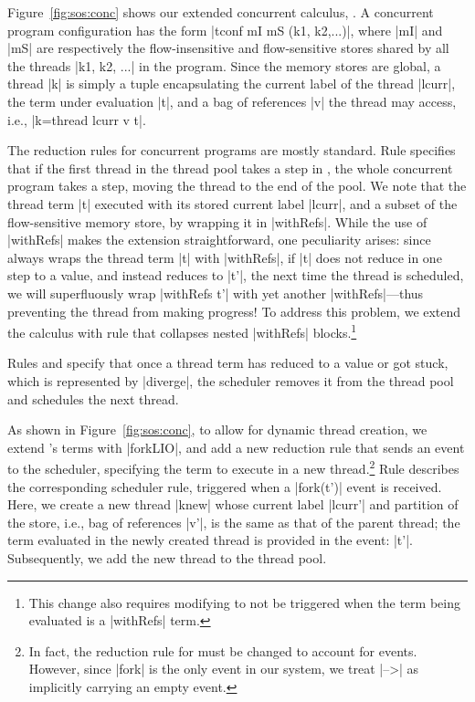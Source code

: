 Figure~\ref{fig:sos:conc} shows our extended concurrent calculus, \lioconc{}.
%
A concurrent program configuration has the form |tconf mI mS (k1, k2,...)|,
where |mI| and |mS| are respectively the flow-insensitive and flow-sensitive
stores shared by all the threads |k1, k2, ...| in the program.
%
Since the memory stores are global, a thread |k| is simply a tuple
encapsulating the current label of the thread |lcurr|, the term under
evaluation |t|, and a bag of references |v| the thread may access, i.e.,
|k=thread lcurr v t|.

The reduction rules for concurrent programs are mostly standard.
%
Rule  specifies that if the first thread in the thread pool
takes a step in \lioafs{}, the whole concurrent program takes a step, moving
the thread to the end of the pool.
%
We note that the thread term |t| executed with its stored current label
|lcurr|, and a subset of the flow-sensitive memory store, by wrapping it in
|withRefs|.
%
While the use of |withRefs| makes the extension straightforward, one
peculiarity arises: since  always wraps the thread term |t|
with |withRefs|, if |t| does not reduce in one step to a value, and instead
reduces to |t'|, the next time the thread is scheduled, we will superfluously
wrap |withRefs t'| with yet another |withRefs|---thus preventing the thread
from making progress!
%
To address this problem, we extend the calculus with rule  that
collapses nested |withRefs| blocks.\footnote{
This change also requires modifying  to not be triggered when
the term being evaluated is a |withRefs| term.
}
 
Rules  and  specify that once a thread term
has reduced to a value or got stuck, which is represented by |diverge|, the
scheduler removes it from the thread pool and schedules the next thread.

%
As shown in Figure~\ref{fig:sos:conc}, to allow for dynamic thread creation, we
extend \lioafs{}'s terms with |forkLIO|, and add a new reduction rule that sends
an event to the scheduler, specifying the term to execute in a new
thread.\footnote{
In fact, the reduction rule for \lioafs{} must be changed to account for events.
However, since |fork| is the only event in our system, we treat |-->| as
implicitly carrying an empty event.
}
%
Rule  describes the corresponding scheduler rule, triggered
when a |fork(t')| event is received.
%
Here, we create a new thread |knew| whose current label |lcurr'| and partition
of the store, i.e., bag of references |v'|, is the same as that of the parent
thread; the term evaluated in the newly created thread is provided in the
event: |t'|.
%
Subsequently, we add the new thread to the thread pool.

